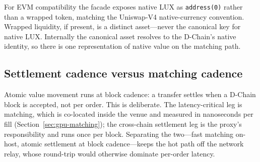 For EVM compatibility the facade exposes native LUX as \texttt{address(0)} rather than a
wrapped token, matching the Uniswap-V4 native-currency convention. Wrapped liquidity, if
present, is a distinct asset---never the canonical key for native LUX. Internally the
canonical asset resolves to the D-Chain's native identity, so there is one representation
of native value on the matching path.

\subsection{Settlement cadence versus matching cadence}

Atomic value movement runs at block cadence: a transfer settles when a D-Chain block is
accepted, not per order. This is deliberate. The latency-critical leg is matching, which
is co-located inside the venue and measured in nanoseconds per fill
(Section~\ref{sec:gpu-matching}); the cross-chain settlement leg is the proxy's
responsibility and runs once per block. Separating the two---fast matching on-host, atomic
settlement at block cadence---keeps the hot path off the network relay, whose round-trip
would otherwise dominate per-order latency.
